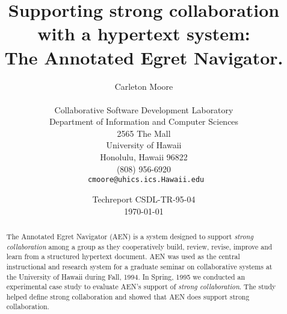 

\title{Supporting strong collaboration with a hypertext system:\\ 
The Annotated Egret Navigator.}

\author {Carleton Moore\\
\\ Collaborative Software Development Laboratory\\ Department of
Information and Computer Sciences\\ 2565 The Mall\\ University of Hawaii\\
Honolulu, Hawaii 96822\\ (808) 956-6920\\ {\tt
cmoore@uhics.ics.Hawaii.edu}} \date{Techreport CSDL-TR-95-04\\ \today}

\maketitle

\begin{abstract}
  The Annotated Egret Navigator (AEN) is a system designed to support
  {\em strong collaboration} among a group as they cooperatively build,
  review, revise, improve and learn from a structured hypertext document.
  AEN was used as the central instructional and research system for a
  graduate seminar on collaborative systems at the University of Hawaii
  during Fall, 1994.  In Spring, 1995 we conducted an experimental case
  study to evaluate AEN's support of {\em strong collaboration}.  The
  study helped define strong collaboration and showed that AEN does
  support strong collaboration.


\end{abstract}

